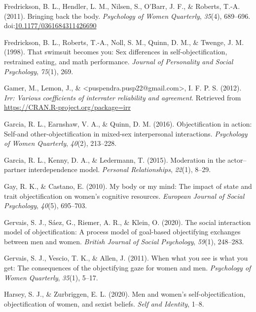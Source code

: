 \documentclass[man]{apa6}
\begin{document}
\hypertarget{ref-fredricksonetal2011}{}
Fredrickson, B. L., Hendler, L. M., Nilsen, S., O'Barr, J. F., \&
Roberts, T.-A. (2011). Bringing back the body. \emph{Psychology of Women
Quarterly}, \emph{35}(4), 689--696.
doi:\href{https://doi.org/10.1177/0361684311426690}{10.1177/0361684311426690}

\hypertarget{ref-fredrickson1998swimsuit}{}
Fredrickson, B. L., Roberts, T.-A., Noll, S. M., Quinn, D. M., \&
Twenge, J. M. (1998). That swimsuit becomes you: Sex differences in
self-objectification, restrained eating, and math performance.
\emph{Journal of Personality and Social Psychology}, \emph{75}(1), 269.

\hypertarget{ref-R-irr}{}
Gamer, M., Lemon, J., \&
\textless{}puspendra.pusp22@gmail.com\textgreater{}, I. F. P. S. (2012).
\emph{Irr: Various coefficients of interrater reliability and
agreement}. Retrieved from \url{https://CRAN.R-project.org/package=irr}

\hypertarget{ref-garcia2016objectification}{}
Garcia, R. L., Earnshaw, V. A., \& Quinn, D. M. (2016). Objectification
in action: Self-and other-objectification in mixed-sex interpersonal
interactions. \emph{Psychology of Women Quarterly}, \emph{40}(2),
213--228.

\hypertarget{ref-garcia2015moderation}{}
Garcia, R. L., Kenny, D. A., \& Ledermann, T. (2015). Moderation in the
actor--partner interdependence model. \emph{Personal Relationships},
\emph{22}(1), 8--29.

\hypertarget{ref-gay2010my}{}
Gay, R. K., \& Castano, E. (2010). My body or my mind: The impact of
state and trait objectification on women's cognitive resources.
\emph{European Journal of Social Psychology}, \emph{40}(5), 695--703.

\hypertarget{ref-gervais2020social}{}
Gervais, S. J., Sáez, G., Riemer, A. R., \& Klein, O. (2020). The social
interaction model of objectification: A process model of goal-based
objectifying exchanges between men and women. \emph{British Journal of
Social Psychology}, \emph{59}(1), 248--283.

\hypertarget{ref-gervais2011you}{}
Gervais, S. J., Vescio, T. K., \& Allen, J. (2011). When what you see is
what you get: The consequences of the objectifying gaze for women and
men. \emph{Psychology of Women Quarterly}, \emph{35}(1), 5--17.

\hypertarget{ref-harsey2020men}{}
Harsey, S. J., \& Zurbriggen, E. L. (2020). Men and women's
self-objectification, objectification of women, and sexist beliefs.
\emph{Self and Identity}, 1--8.
\end{document}
